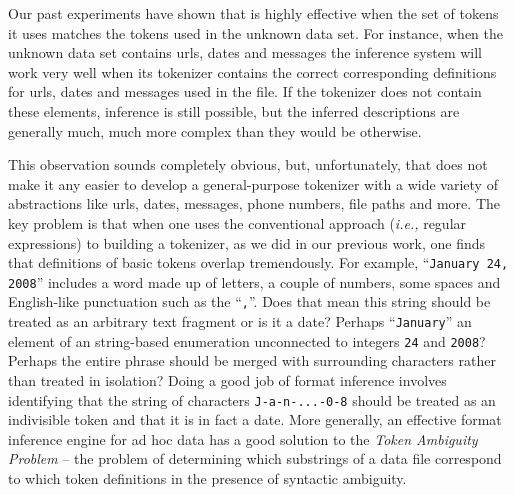 Our past experiments have shown that \learnpads{} is highly effective
when the set of tokens it uses matches the tokens used in the unknown
data set.  For instance, when the unknown data set contains 
urls, dates and messages the inference system will work very well when
its tokenizer contains the correct corresponding definitions
for urls, dates and messages used in the file.  If the
tokenizer does not contain these elements, inference is still possible,
but the inferred descriptions are generally much, much more complex
than they would be otherwise. 

This observation sounds completely obvious, but, unfortunately,
that does not make it any easier to develop a general-purpose tokenizer
with a wide variety of abstractions like urls, dates, messages,
phone numbers, file paths and more.  The key problem is that
when one uses the conventional approach ({\em i.e.,} regular expressions)
to building a tokenizer, as we did in our previous work, one finds
that definitions of basic tokens overlap tremendously.  For example,
``{\tt January 24, 2008}'' includes a word made up of letters, a couple 
of numbers,
some spaces and English-like punctuation such as the ``{\tt ,}''.  Does that mean 
this string should be treated as an arbitrary text fragment or 
is it a date? Perhaps ``{\tt January}'' an element of an string-based enumeration 
unconnected to integers {\tt 24} and {\tt 2008}?  Perhaps the entire phrase
should be merged with surrounding characters rather than treated
in isolation?  Doing a good job of format
inference involves identifying that the string of characters
{\tt J-a-n-...-0-8} should be treated as an indivisible token and that it is
in fact a date.  More generally, an effective format inference engine
for ad hoc data has a good solution to the {\em Token Ambiguity Problem}
-- the problem of determining which substrings of a data file correspond
to which token definitions in the presence of syntactic 
ambiguity.

